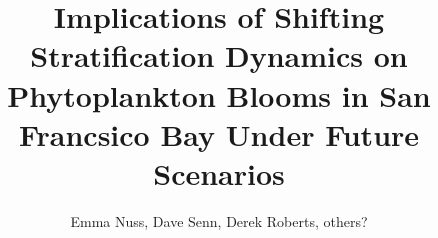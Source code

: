 \documentclass[preprint,review,12pt]{elsarticle}
\begin{document}
\newcommand\fnurl[2]{%
\href{#1}{#2}\footnote{\url{#1}}%
}

\begin{frontmatter}
\RaggedRight

\title{Implications of Shifting Stratification Dynamics on Phytoplankton Blooms in San Francsico Bay Under Future Scenarios}




\author{Emma Nuss, Dave Senn, Derek Roberts, others?}




\begin{keyword}



\end{keyword}

\end{frontmatter}

\linenumbers

\end{document}
